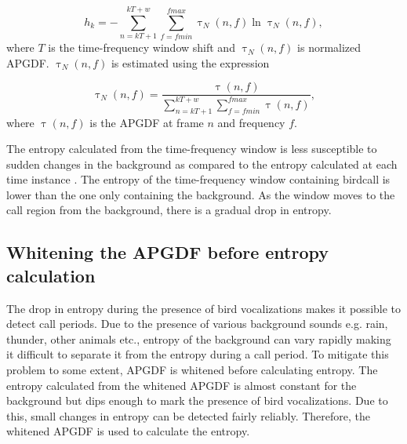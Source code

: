 \documentclass[a4paper]{article}
\begin{document}
\begin{equation}
\label{eq:2}
 h_{k}=-\sum_{n=kT+1}^{kT+w}\sum_{f=fmin}^{fmax} \uptau_N(n,f) \ln \uptau_N(n,f),
\end{equation}
where $T$ is the time-frequency window shift and $\uptau_N(n,f)$ is normalized
APGDF. $\uptau_N(n,f)$ is estimated using the expression 


    
\begin{equation}
\label{eq:3}
\uptau_N(n,f)=\frac {\uptau(n,f)}
{\sum_{n=kT+1}^{kT+w}\sum_{f=fmin}^{fmax} \uptau(n,f)},
\end{equation}
where $\uptau(n,f)$ is the APGDF at frame $n$ and frequency $f$.

The entropy calculated from the time-frequency window is less susceptible to sudden
changes in the background as compared to the entropy calculated at each time
instance \cite{wang2013}. The entropy of the time-frequency window containing
birdcall is lower than the one only containing the background. As the
window moves to the call region from the background, there is a gradual drop in
entropy. 




 


\subsection{Whitening the APGDF before entropy calculation}

The drop in entropy during the presence of bird vocalizations makes it possible
to detect call periods. Due to the presence of various background sounds e.g.
rain, thunder, other animals etc., entropy of the background can  vary rapidly
making it difficult to separate it from the entropy during a call period. To
mitigate this problem to some extent, APGDF is whitened  before calculating
entropy. The entropy calculated from the whitened APGDF is almost constant for
the background but dips enough to mark the presence of bird vocalizations. Due
to this, small changes in entropy can be detected fairly reliably. Therefore, the whitened APGDF is used to calculate the entropy.
\end{document}
